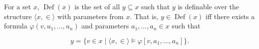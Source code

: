 For a set $x$, $\operatorname{Def}(x)$ is the set of all $y \subseteq x$ such that $y$ is definable over the structure $\langle x, \in \rangle$ with parameters from $x$. That is, $y \in \operatorname{Def}(x)$ iff there exists a formula $\varphi(v, u_1, \ldots, u_n)$ and parameters $a_1, \ldots, a_n \in x$ such that

$$y = \{v \in x \mid \langle x, \in \rangle \models \varphi[v, a_1, \ldots, a_n]\}.$$
